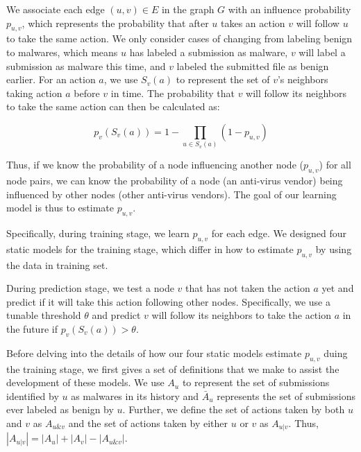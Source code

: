We associate each edge $(u, v) \in E$ in the graph $G$ 
with an influence probability $p_{u,v}$,
which represents the probability that after $u$ takes an action $v$ will follow $u$ to take the same action.
We only consider cases of changing from labeling benign to malwares, 
which means $u$ has labeled a submission as malware, $v$ will label a submission as malware this time, 
and $v$ labeled the submitted file as benign earlier. 
For an action $a$, we use $S_v(a)$ to represent the set of $v$'s neighbors taking action $a$ before $v$ in time. 
The probability that $v$ will follow its neighbors to take the same action can then be calculated as:

\begin{equation} \label{eq:setp}
p_v(S_v(a)) = 1 - \prod\limits_{u \in S_v(a)}(1 - p_{u,v})
\end{equation}

Thus, if we know the probability of a node influencing another node ($p_{u,v}$) for all node pairs,
we can know the probability of a node (an anti-virus vendor) being influenced by other nodes (other anti-virus vendors).
The goal of our learning model is thus to estimate $p_{u,v}$.

Specifically, during training stage, we learn $p_{u,v}$ for each edge. 
We designed four static models for the training stage, which differ in how to estimate $p_{u,v}$ by using the data in training set. 

During prediction stage, we test a node $v$ that has not taken the action $a$ yet
and predict if it will take this action following other nodes. 
Specifically, we use a tunable threshold $\theta$
and predict $v$ will follow its neighbors to take the action $a$ in the future
if $p_v(S_v(a))>\theta$.

Before delving into the details of how our four static models estimate $p_{u,v}$ duing the training stage, 
we first gives a set of definitions that we make to assist the development of these models.
We use $A_u$ to represent the set of submissions identified by $u$ as malwares in its history
and $\bar{A}_u$ represents the set of submissions ever labeled as benign by $u$.
Further, we define the set of actions taken by both $u$ and $v$ as $A_{u\&v}$ 
and the set of actions taken by either $u$ or $v$ as $A_{u|v}$.
Thus, $|A_{u|v}| =   |A_u| + |A_v| - |A_{u\&v}|$.

